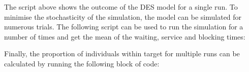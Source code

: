 

The script above shows the outcome of the DES model for a single run.
To minimise the stochasticity of the simulation, the model can be simulated for 
numerous trials. 
The following script can be used to run the simulation for a number of times 
and get the mean of the waiting, service and blocking times:




Finally, the proportion of individuals within target for multiple runs can be
calculated by running the following block of code:



